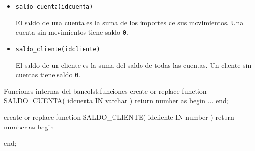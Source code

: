 \begin{homeworkProblem}

  \begin{itemize}
  \item \texttt{saldo\_cuenta(idcuenta)}

    \begin{Indentado}
      El saldo de una cuenta es la suma de los importes de sus movimientos. Una cuenta sin movimientos tiene saldo \texttt{0}.
    \end{Indentado}
    
  \item \texttt{saldo\_cliente(idcliente)}

    \begin{Indentado}
      El saldo de un cliente es la suma del saldo de todas las cuentas. Un cliente sin cuentas tiene saldo \texttt{0}.
    \end{Indentado}


  \end{itemize}

\begin{listadosql}{Funciones internas del banco}{lst:funciones}
create or replace function SALDO_CUENTA( idcuenta IN varchar )
return number as begin
  ...
end; 

create or replace function SALDO_CLIENTE( idcliente IN number )
return number as begin
  ...

end; 

\end{listadosql}


\end{homeworkProblem}


